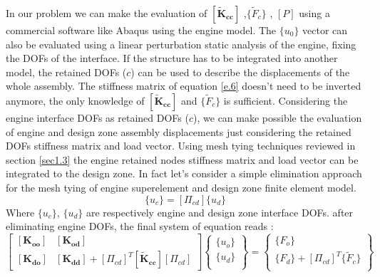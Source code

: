 In our problem we can make the evaluation of $ \left[ \mathbf{\tilde{K}_{cc}}\right]$ ,$\lbrace \tilde{F}_c \rbrace$ , $\left[ P\right]$ using a commercial software like Abaqus using the engine model. 
The $\lbrace u_0 \rbrace$ vector can also be evaluated using a linear perturbation static analysis of the engine, fixing the DOFs of the interface. If the structure has to be integrated into another model, the retained DOFs ($c$) can be used to describe the displacements of the whole assembly. The stiffness matrix of equation \ref{e.6} doesn't need to be inverted anymore, the only knowledge of $\left[\mathbf{\tilde{K}_{cc}}\right]$ and $\lbrace \tilde{F}_c \rbrace$ is sufficient.
Considering the engine interface DOFs as retained DOFs ($c$), we can make possible the evaluation of engine and design zone assembly displacements just considering the retained DOFs stiffness matrix and load vector. Using mesh tying techniques reviewed in section \ref{sec1.3} the engine retained nodes stiffness matrix and load vector can be integrated to the design zone.
In fact let's consider a simple elimination approach for the mesh tying of engine superelement and design zone finite element model.
  \begin{equation}
    \lbrace u_c \rbrace = \left[ \Pi_{cd} \right] \lbrace u_{d}\rbrace
    \end{equation}
Where $\lbrace u_c \rbrace$, $\lbrace u_{d}\rbrace $ are respectively engine and design zone interface DOFs.
after eliminating engine DOFs, the final system of equation reads :
    \begin{equation}
    \label{eq.1.119}
    \left[ \begin{array}{cc}
    \left[ \mathbf{K_{oo}} \right] & \left[ \mathbf{K_{od}} \right]\\
    \left[ \mathbf{K_{do}} \right] & \left[ \mathbf{K_{dd}} \right]+\left[ \Pi_{cd} \right]^T\left[ \mathbf{\tilde{K}_{cc}} \right]\left[ \Pi_{cd} \right]
    \end{array} \right] \left\lbrace \begin{array}{c}
    \lbrace u_o \rbrace\\
    \lbrace u_d \rbrace\\
    \end{array}\right\rbrace =  \left\lbrace \begin{array}{c}
    \lbrace F_o \rbrace\\
    \lbrace F_d\rbrace+\left[ \Pi_{cd} \right]^T\lbrace \tilde{F}_c\rbrace\\
    \end{array}\right\rbrace
    \end{equation} 
